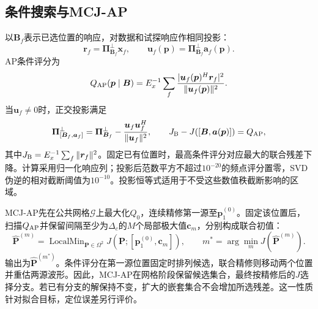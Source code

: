 \documentclass[a4paper,fleqn]{cas-sc}
\begin{document}
\subsection{条件搜索与MCJ-AP}
以$\bm B_f$表示已选位置的响应，对数据和试探响应作相同投影：
\begin{equation}
\bm r_f=\bm\Pi_{\bm B_f}^{\perp}\bm x_f,\qquad
\bm u_f(\bm p)=\bm\Pi_{\bm B_f}^{\perp}\bm a_f(\bm p).
\end{equation}
AP条件评分为
\begin{equation}
Q_{\rm AP}(\bm p\mid\bm B)=E_x^{-1}\sum_f
 \frac{|\bm u_f(\bm p)^H\bm r_f|^2}{\|\bm u_f(\bm p)\|^2}.
\label{en:conditional}
\end{equation}
当$\bm u_f\ne0$时，正交投影满足
\begin{equation}
\bm\Pi_{[\bm B_f,\bm a_f]}^{\perp}
=\bm\Pi_{\bm B_f}^{\perp}-\frac{\bm u_f\bm u_f^H}{\|\bm u_f\|^2},
\qquad J_{\rm B}-J([\bm B,\bm a(\bm p)])=Q_{\rm AP},
\label{en:gain}
\end{equation}
其中$J_{\rm B}=E_x^{-1}\sum_f\|\bm r_f\|^2$。固定已有位置时，最高条件评分对应最大的联合残差下降\cite{ChenHudsonYao2002}。计算采用归一化响应列；投影后范数平方不超过$10^{-20}$的频点评分置零，SVD伪逆的相对截断阈值为$10^{-10}$。投影恒等式适用于不受这些数值秩截断影响的区域。

MCJ-AP先在公共网格$\mathcal G$上最大化$Q_0$，连续精修第一源至$\bm p_1^{(0)}$。固定该位置后，扫描$Q_{\rm AP}$并保留间隔至少为$\Delta_c$的$M$个局部极大值$\bm c_m$，分别构成联合初值：
\begin{equation}
\widehat{\bm P}^{(m)}=\operatorname{LocalMin}_{\bm P\in\Omega^2}
 J(\bm P;[\bm p_1^{(0)},\bm c_m]),\qquad
m^*=\arg\min_m J(\widehat{\bm P}^{(m)}).
\label{en:branch}
\end{equation}
输出为$\widehat{\bm P}^{(m^*)}$。条件评分在第一源位置固定时排列候选，联合精修则移动两个位置并重估两源波形。因此，MCJ-AP在网格阶段保留候选集合，最终按精修后的$J$选择分支。若已有分支的解保持不变，扩大的嵌套集合不会增加所选残差。这一性质针对拟合目标，定位误差另行评价。
\end{document}
